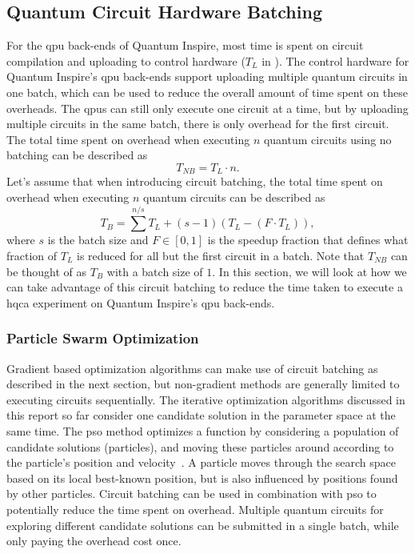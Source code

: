 \subsection{Quantum Circuit Hardware Batching} \label{sec:circuit-batching}
For the \gls{qpu} back-ends of Quantum Inspire, most time is spent on circuit compilation and uploading to control hardware ($T_L$ in ).
The control hardware for Quantum Inspire's \gls{qpu} back-ends support uploading multiple quantum circuits in one batch, which can be used to reduce the overall amount of time spent on these overheads.
The \glspl{qpu} can still only execute one circuit at a time, but by uploading multiple circuits in the same batch, there is only overhead for the first circuit.
The total time spent on overhead when executing $n$ quantum circuits using no batching can be described as
\begin{equation}
T_{NB} = T_L \cdot n.
\end{equation}
Let's assume that when introducing circuit batching, the total time spent on overhead when executing $n$ quantum circuits can be described as
\begin{equation} \label{eqn:batching-analytic}
T_{B} = \sum^{n/s} T_L + (s-1)\left(T_L - \left(F \cdot T_L\right)\right),
\end{equation}
where $s$ is the batch size and $F \in [0, 1]$ is the speedup fraction that defines what fraction of $T_L$ is reduced for all but the first circuit in a batch.
Note that $T_{NB}$ can be thought of as $T_B$ with a batch size of $1$.
In this section, we will look at how we can take advantage of this circuit batching to reduce the time taken to execute a \gls{hqca} experiment on Quantum Inspire's \gls{qpu} back-ends.

\subsubsection{Particle Swarm Optimization}
Gradient based optimization algorithms can make use of circuit batching as described in the next section, but non-gradient methods are generally limited to executing circuits sequentially.
The iterative optimization algorithms discussed in this report so far consider one candidate solution in the parameter space at the same time.
The \gls{pso} method optimizes a function by considering a population of candidate solutions (particles), and moving these particles around according to the particle's position and velocity~\cite{kennedy1995particle, shi1998modified}.
A particle moves through the search space based on its local best-known position, but is also influenced by positions found by other particles.
Circuit batching can be used in combination with \gls{pso} to potentially reduce the time spent on overhead.
Multiple quantum circuits for exploring different candidate solutions can be submitted in a single batch, while only paying the overhead cost once.

